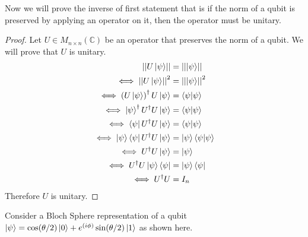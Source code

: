\documentclass[addpoints]{exam}
\newcommand{\inner}[2]{\left\langle #1 | #2\right\rangle}
\newcommand{\norm}[1]{\left|\left|#1\right|\right|}
\begin{document}
\begin{questions}
\begin{solution}
		Now we will prove the inverse of first statement that is if the norm of a qubit is preserved by applying an operator on it, then the operator must be unitary.
		\begin{proof}
			Let \(U\in M_{n\times n}(\mathbb{C})\) be an operator that preserves the norm of a qubit. We will prove that \(U\) is unitary.
			\begin{align*}
				\norm{U\ket{\psi}}                                & = \norm{\ket{\psi}}            \\
				\iff \norm{U\ket{\psi}}^2                         & = \norm{\ket{\psi}}^2          \\
				\iff \left(U\ket{\psi}\right)^\dagger U\ket{\psi} & = \inner{\psi}{\psi}           \\
				\iff \ket{\psi}^\dagger U^\dagger U\ket{\psi}     & = \inner{\psi}{\psi}           \\
				\iff \bra{\psi} U^\dagger U\ket{\psi}             & = \inner{\psi}{\psi}           \\
				\iff \ket{\psi}\bra{\psi} U^\dagger U\ket{\psi}   & = \ket{\psi}\inner{\psi}{\psi} \\
				\iff U^\dagger U\ket{\psi}                        & = \ket{\psi}                   \\
				\iff U^\dagger U\ket{\psi}\bra{\psi}              & = \ket{\psi}\bra{\psi}         \\
				\iff U^\dagger U                                  & = I_n
			\end{align*}
			Therefore \(U\) is unitary.
		\end{proof}
	\end{solution}
	\question[10] Consider a Bloch Sphere representation of a qubit $\ket{\psi} = \cos(\theta/2)\ket{0} + e^{(i\phi)} \sin(\theta/2)\ket{1}$ as shown here.


\end{questions}
\end{document}
